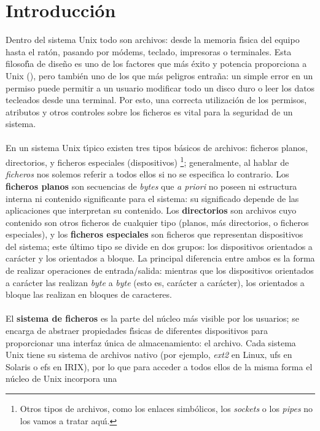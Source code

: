 \section{Introducci\'on}
Dentro del sistema Unix todo son archivos: desde la memoria f\'{\i}sica del 
equipo hasta el rat\'on, pasando por m\'odems, teclado, impresoras o terminales.
Esta filosof\'{\i}a de dise\~no es uno de los factores que m\'as \'exito y
potencia proporciona a Unix (\cite{kn:ker84}), pero tambi\'en uno de los que
m\'as peligros entra\~na: un simple error en un permiso puede permitir a un
usuario modificar todo un disco duro o leer los datos tecleados desde una
terminal. Por esto, una correcta utilizaci\'on de los permisos, atributos y
otros controles sobre los ficheros es vital para la seguridad de un sistema.\\ 
\\En un sistema Unix t\'{\i}pico existen tres tipos b\'asicos de archivos: 
ficheros planos, directorios, y ficheros especiales (dispositivos)
\footnote{Otros tipos de archivos, como los enlaces simb\'olicos, los {\it 
sockets} o los {\it pipes} no los vamos a tratar aqu\'{\i}.}; generalmente,
al hablar de {\it ficheros} nos solemos referir a todos ellos si no se
especifica lo contrario. Los {\bf ficheros 
planos} son secuencias de {\it bytes} que {\it a priori} no poseen ni estructura
interna ni contenido significante para el sistema: su significado depende de 
las aplicaciones que interpretan su contenido. Los {\bf directorios} son 
archivos cuyo contenido son otros ficheros de cualquier tipo (planos, m\'as 
directorios, o ficheros especiales), y los {\bf ficheros especiales} son 
ficheros que representan dispositivos del sistema; este \'ultimo tipo se divide
en dos grupos: los dispositivos orientados a car\'acter y los orientados a 
bloque. La principal diferencia entre ambos es la forma de realizar operaciones
de entrada/salida: mientras que los dispositivos orientados a car\'acter las
realizan {\it byte} a {\it byte} (esto es, car\'acter a car\'acter), los 
orientados a bloque las realizan en bloques de caracteres.\\
\\El {\bf sistema de ficheros} es la parte del n\'ucleo m\'as visible por los 
usuarios; se encarga de abstraer propiedades f\'{\i}sicas de diferentes 
dispositivos para proporcionar una interfaz \'unica de almacenamiento: el
archivo. Cada sistema Unix tiene su sistema de archivos nativo (por ejemplo,
{\it ext2} en Linux, {\sc ufs} en Solaris o {\sc efs} en IRIX), por lo que
para acceder a todos ellos de la misma forma el n\'ucleo de Unix incorpora una 
